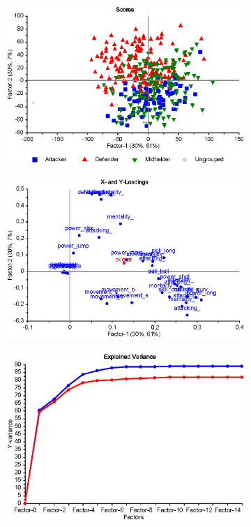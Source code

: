 \begin{figure}[h]
 	\centering
 	\begin{subfigure}[t]{0.48\textwidth}
 		\centering
 		\includegraphics[width=\textwidth]{figurer/fifa-pls-scores}
 		\caption{}
 		\label{}
 	\end{subfigure}	
 	\begin{subfigure}[t]{0.48\textwidth}
 		\centering
 		\includegraphics[width=\textwidth]{figurer/fifa-pls-loadings}
 		\caption{}
 		\label{}
 	\end{subfigure}
 	\begin{subfigure}[t]{0.48\textwidth}
 		\centering
 		\includegraphics[width=\textwidth]{figurer/fifa-pls-ev}

\end{subfigure}
\end{figure}
